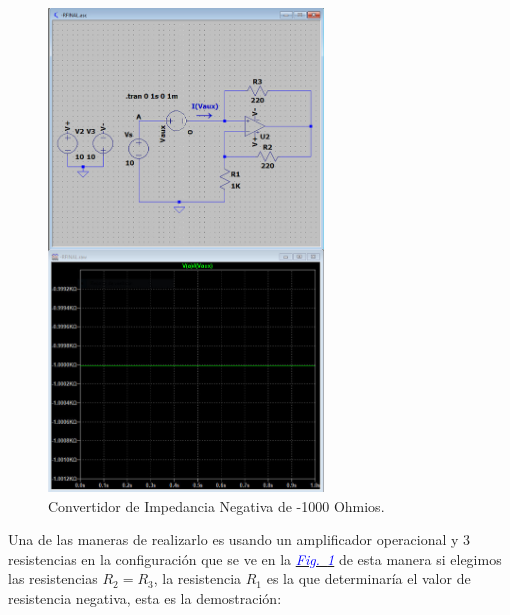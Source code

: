 \documentclass[12pt,a4paper]{report} %
\newcommand{\fref}[1]{\hyperref[#1]{\textcolor{blue}{\textit{Fig.~\ref*{#1}}}}}
\begin{document}
	\begin{figure}[h]
		\centering
		\includegraphics[width=0.65\textwidth]{NIC_B.jpg}
		\caption{Convertidor de Impedancia Negativa de -1000 Ohmios.}
		\label{fig:NIC}
	\end{figure}
	
	\newpage
	
	Una de las maneras de realizarlo es usando un amplificador operacional y 3 resistencias en la configuración que se ve en la \fref{fig:NIC} de esta manera si elegimos las resistencias $R_2=R_3$, la resistencia $R_1$ es la que determinaría el valor de resistencia negativa, esta es la demostración:
	
	\vspace{0.5cm}
	
\end{document}

